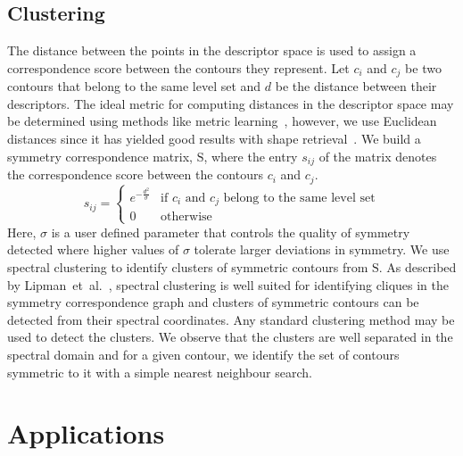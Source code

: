 \documentclass[review,journal]{vgtc}         %
\begin{document}
\subsection{Clustering}\label{clust}
The distance between the points in the descriptor space is used to assign 
a correspondence score between the contours they represent. Let $c_i$
and $c_j$ be two contours that belong to the same level set and $d$ be
the distance between their descriptors. The ideal metric for computing
distances in the descriptor space may be determined using methods like
metric learning~\cite{Kulis13}, however, we use
Euclidean distances since it has yielded good results with shape 
retrieval~\cite{reuter2006laplace,lian2013}. We build a symmetry
correspondence matrix, $\mathrm{S}$, where the entry $s_{ij}$ of the
matrix denotes the correspondence score between the contours $c_i$
and $c_j$.
$$s_{ij} = 
\begin{cases}
	e^{-\frac{d^2}{\sigma}} & \text{if $c_i$ and $c_j$ belong to the same level set}\\
	0 & \text{otherwise}
\end{cases}
$$
Here, $\sigma$ is a user defined parameter that controls the quality of symmetry detected
where higher values of $\sigma$ tolerate larger deviations in symmetry. We use spectral clustering
to identify clusters of symmetric contours from $\mathrm{S}$. As described by 
Lipman~et~al.~\cite{Lip10}, spectral clustering is well suited for identifying
cliques in the symmetry correspondence graph and clusters of symmetric
contours can be detected from their spectral coordinates. Any standard clustering
method may be used to detect the clusters. We observe that the clusters
are well separated in the spectral domain and for a given contour, we identify
the set of contours symmetric to it with a simple nearest neighbour search.
\section{Applications}
\end{document}
